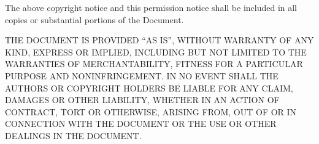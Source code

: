 \documentclass[twocolumn,10pt]{article}
\begin{document}
The above copyright notice and this permission notice shall be included in all copies or substantial portions of the Document.

THE DOCUMENT IS PROVIDED “AS IS”, WITHOUT WARRANTY OF ANY KIND, EXPRESS OR IMPLIED, INCLUDING BUT NOT LIMITED TO THE WARRANTIES OF MERCHANTABILITY, FITNESS FOR A PARTICULAR PURPOSE AND NONINFRINGEMENT. IN NO EVENT SHALL THE AUTHORS OR COPYRIGHT HOLDERS BE LIABLE FOR ANY CLAIM, DAMAGES OR OTHER LIABILITY, WHETHER IN AN ACTION OF CONTRACT, TORT OR OTHERWISE, ARISING FROM, OUT OF OR IN CONNECTION WITH THE DOCUMENT OR THE USE OR OTHER DEALINGS IN THE DOCUMENT.

\newpage
\printbibliography
\end{document}
